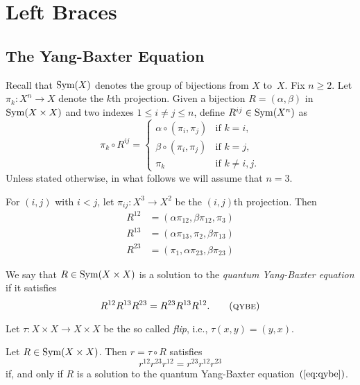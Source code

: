 \chapter{Left Braces}
\section{The Yang-Baxter Equation}
\setcounter{subsection}{1}

Recall that ${\rm Sym}(X)$ denotes the group of bijections from $X$ to~$X$. Fix $n\ge2$. Let $\pi_k\colon X^n\to X$ denote the $k$th projection. Given a bijection $R=(\alpha,\beta)$ in ${\rm Sym}(X\times X)$ and two indexes $1\le i\ne j\le n$, define $R^{ij}\in{\rm Sym}(X^n)$ as
$$
    \pi_k\circ R^{ij} = \begin{cases}
        \alpha\circ(\pi_i,\pi_j)    &\text{if }k=i,\\
        \beta\circ(\pi_i,\pi_j)     &\text{if }k=j,\\
        \pi_k   &\text{if }k\ne i,j.
    \end{cases}
$$
Unless stated otherwise, in what follows we will assume that $n=3$.

For $(i,j)$ with $i<j$, let $\pi_{ij}\colon X^3\to X^2$ be the $(i,j)$th projection. Then
\begin{align}\label{eq:R^ij-i<j}
    R^{12} &= (\alpha\pi_{12},\beta\pi_{12},\pi_3)\nonumber\\
    R^{13} &= (\alpha\pi_{13},\pi_2,\beta\pi_{13})\\
    R^{23} &= (\pi_1,\alpha\pi_{23},\beta\pi_{23})\nonumber
\end{align}


\begin{defn}
    We say that\/ $R\in{\rm Sym}(X\times X)$ is a solution to the \textsl{quantum Yang-Baxter equation} if it satisfies
    \begin{equation}\label{eq:qybe}
        R^{12}R^{13}R^{23} = R^{23}R^{13}R^{12}.\tag{\textsc{qybe}} 
    \end{equation}
\end{defn}

Let $\tau\colon X\times X\to X\times X$ be the so called \textsl{flip}, i.e., $\tau(x,y)=(y,x)$.


\begin{prop}
    Let\/ $R\in{\rm Sym}(X\times X)$. Then\/ $r=\tau\circ R$ satisfies
    \begin{equation}\label{eq:ybe}
        r^{12}r^{23}r^{12} = r^{23}r^{12}r^{23}
    \end{equation}
    if, and only if\/ $R$ is a solution to the quantum Yang-Baxter equation\/~$(\ref{eq:qybe})$.
\end{prop}

